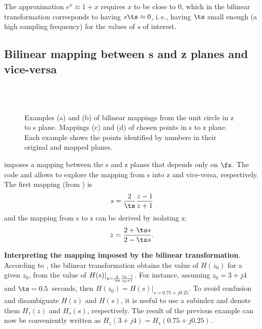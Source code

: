 The approximation $e^x \approx 1 + x$ requires $x$ to be close to 0, which in the bilinear transformation corresponds to having $s \ts \approx 0$, i.\,e., having $\ts$ small enough (a high sampling frequency) for the values of $s$ of interest.

\subsection{Bilinear mapping between s and z planes and vice-versa}

\begin{figure}[!htb]
  \begin{center}
     \textrm{~~~~~~~~~~}
    \\
		\textrm{~~~~~~~~~~}
  \end{center}
  \caption{Examples (a) and (b) of bilinear mappings from the unit circle in z to s plane. Mappings (c) and (d) of chosen points in s to z plane. Each
	example shows the points identified by numbers in their original and mapped planes.\label{fig:bilinear_maps}}  
\end{figure}

 imposes a mapping between the s and z planes that depends only on $\fs$.
The code  and  allows to explore the mapping from s into z and vice-versa, respectively. The first mapping (from ) is
\begin{equation}
s=\frac{2}{\ts} \frac{z-1}{z+1}
\label{eq:bilinear_z_to_s}
\end{equation}
and the mapping from s to z can be derived by isolating z:
\begin{equation}
z= \frac{2+\ts s}{2- \ts s}.
\label{eq:bilinear_s_to_z}
\end{equation}

\bExample \textbf{Interpreting the mapping imposed by the bilinear transformation}.
According to , the bilinear transformation obtains the value of $H(z_0)$ 
for a given $z_0$, from the value of $H(s)|_{s=\frac{2}{\ts} \frac{z_0-1}{z_0+1} }$.
For instance, assuming $z_0 =  3+j4$ and $\ts=0.5$~seconds, then $H(z_0) = H(s)|_{s=0.75+j0.25}$.
To avoid confusion and disambiguate $H(z)$ and $H(s)$, it is useful to use a subindex and denote them $H_z(z)$ and $H_s(s)$, respectively. The result of the previous example can now be conveniently written as $H_z(3+j4) = H_s(0.75+j0.25)$.
\eExample 

